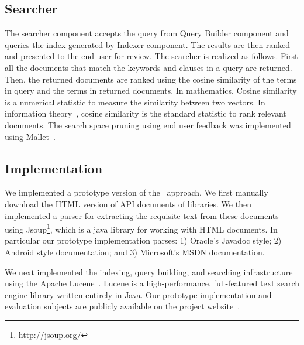 \subsection{Searcher}
\label{sub:approach_searcher}

The searcher component accepts the query from Query Builder component and queries the index generated by Indexer component.
The results are then ranked and presented to the end user for review.
The searcher is realized as follows. 
First all the documents that match the keywords and clauses in a query are returned.
Then, the returned documents are ranked using the cosine similarity\cite{singhal2001modern} of the terms in query and the terms in returned documents. In mathematics, Cosine similarity is a numerical statistic to measure the similarity between two vectors. 
In information theory~\cite{manning2008introduction}, cosine similarity is the standard statistic to rank relevant documents.
The search space pruning using end user feedback was implemented using Mallet~\cite{mccallum2002mallet}.




    


\subsection{Implementation}
\label{sub:Approach_implementation}

We implemented a prototype version of the \tool\ approach.
We first manually download the HTML version of API documents of libraries. 
We then implemented a parser for extracting the requisite text from these documents using 
Jsoup\footnote{\url{http://jsoup.org/}}, which is a java library for working with HTML documents.
In particular our prototype implementation parses: 
1) Oracle's Javadoc style;
2) Android style documentation; and
3) Microsoft's  MSDN documentation.

We next implemented the indexing, query building, and searching infrastructure using the Apache Lucene~\cite{lucene}.
Lucene is a high-performance, full-featured text search engine library written entirely in Java.
Our prototype implementation and evaluation subjects are publicly available on the project website~\cite{projectWeb}. 
